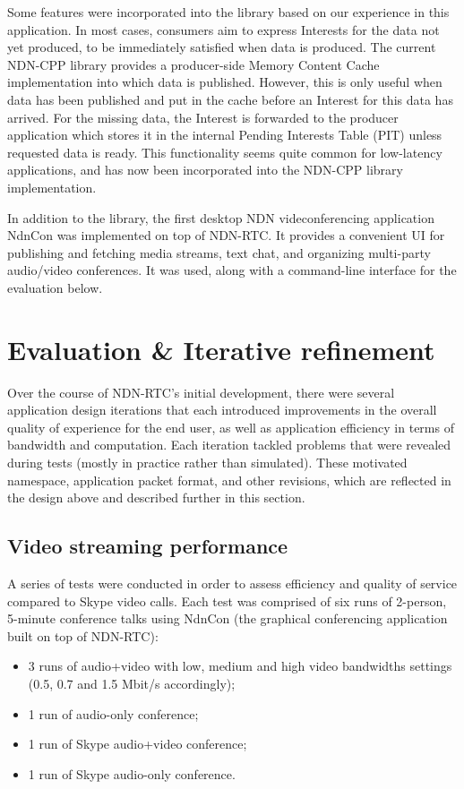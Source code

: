 \documentclass{icn/sig-alternate-2012} %
\newcommand{\ndnrtcName}{NDN-RTC} %
\newcommand{\ndnconName}{NdnCon}
\begin{document}
Some features were incorporated into the library based on our experience in this application.
 In most cases, consumers aim to express Interests for the data not yet produced, to be immediately satisfied when data is produced. The current NDN-CPP library provides a producer-side Memory Content Cache implementation into which data is published. However, this is only useful when data has been published and put in the cache before an Interest for this data has arrived. For the missing data, the Interest is forwarded to the producer application which stores it in the internal Pending Interests Table (PIT) unless requested data is ready. This functionality seems quite common for low-latency applications, and has now been incorporated into the NDN-CPP library implementation.

In addition to the library, the first desktop NDN videconferencing application \ndnconName{} \cite{ndncon} was implemented on top of \ndnrtcName{}. It provides a convenient UI for publishing and fetching media streams, text chat, and organizing multi-party audio/video conferences. It was used, along with a command-line interface for the evaluation below.

\section{Evaluation \& Iterative refinement}
\label{sec:eval} 
Over the course of \ndnrtcName{}'s initial development, there were several application design iterations that each introduced improvements in the overall quality of experience for the end user, as well as application efficiency in terms of bandwidth and computation. Each iteration tackled problems that were revealed during tests (mostly in practice rather than simulated). These motivated namespace, application packet format, and other revisions, which are reflected in the design above and described further in this section. 

\subsection{Video streaming performance}
A series of tests were conducted in order to assess efficiency and quality of service compared to Skype video calls. Each test was comprised of six runs of 2-person, 5-minute conference talks using \ndnconName{} (the graphical conferencing application built on top of \ndnrtcName{}):
\begin{itemize}
\item 3 runs of audio+video with low, medium and high video bandwidths settings (0.5, 0.7 and 1.5 Mbit/s accordingly);
\item 1 run of audio-only conference;
\item 1 run of Skype audio+video conference;
\item 1 run of Skype audio-only conference.
\end{itemize}
\end{document}

